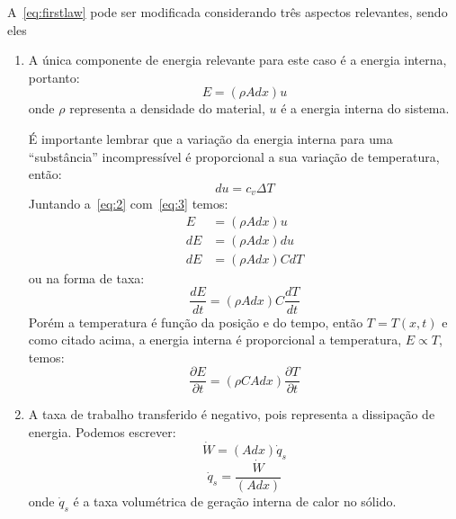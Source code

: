 \documentclass[
	12pt,				  %
	openright,		%
	twoside,			%
	a4paper,			%
	chapter=TITLE,		    %
	english,			%
	brazil				%
	]{abntex2}
\begin{document}
A~\autoref{eq:firstlaw} pode ser modificada considerando três aspectos
relevantes, sendo eles 
\begin{enumerate}
    \item A única componente de energia relevante para este caso é a energia
        interna, portanto:
        \begin{equation}
            E = (\rho A dx) u \label{eq:2}
        \end{equation}
    onde $\rho$ representa a densidade do material, $u$ é a energia interna do
        sistema. 

        É importante lembrar que a variação da energia interna para uma
        ``substância'' incompressível é proporcional a sua variação de
        temperatura, então:
        \begin{equation}
            du = c_v\Delta T \label{eq:3}
        \end{equation}
        Juntando a~\autoref{eq:2} com~\autoref{eq:3} temos:
        \begin{align}
            E &= (\rho A dx)u \\
            dE &= (\rho A dx) du \\
            dE &= (\rho A dx) CdT
        \end{align}
        ou na forma de taxa:
        \begin{equation}
            \frac{dE}{dt} = (\rho A dx) C\frac{dT}{dt}
        \end{equation}
        Porém a temperatura é função da posição e do tempo, então $T = T(x,t)$
        e como citado acima, a energia interna é proporcional a temperatura, $E
        \propto T$, temos:
        \begin{equation}
            \frac{\partial E}{\partial t} = (\rho C A dx) \frac{\partial
            T}{\partial t} \label{eq:4}
        \end{equation}
    \item A taxa de trabalho transferido é negativo, pois representa a
        dissipação de energia. Podemos escrever:
        \begin{equation}
            \dot{W} = (A dx)\dot{q}_s \label{eq:6}
        \end{equation}
        \begin{equation}
            \dot{q}_s = \frac{\dot{W}}{(A dx)}
        \end{equation}
        onde $\dot{q}_s$ é a taxa volumétrica de geração interna de calor no
        sólido. 


\end{enumerate}
\end{document}

